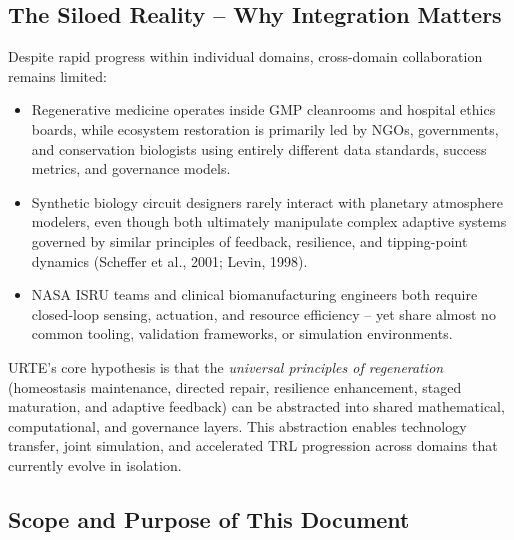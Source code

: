 \documentclass[11pt,a4paper]{article}
\begin{document}
\subsection{The Siloed Reality -- Why Integration Matters}

Despite rapid progress within individual domains, cross-domain collaboration remains limited:

\begin{itemize}
    \item Regenerative medicine operates inside GMP cleanrooms and hospital ethics boards, while ecosystem restoration is primarily led by NGOs, governments, and conservation biologists using entirely different data standards, success metrics, and governance models.
    \item Synthetic biology circuit designers rarely interact with planetary atmosphere modelers, even though both ultimately manipulate complex adaptive systems governed by similar principles of feedback, resilience, and tipping-point dynamics (Scheffer et al., 2001; Levin, 1998).
    \item NASA ISRU teams and clinical biomanufacturing engineers both require closed-loop sensing, actuation, and resource efficiency -- yet share almost no common tooling, validation frameworks, or simulation environments.
\end{itemize}

URTE's core hypothesis is that the \textit{universal principles of regeneration} (homeostasis maintenance, directed repair, resilience enhancement, staged maturation, and adaptive feedback) can be abstracted into shared mathematical, computational, and governance layers. This abstraction enables technology transfer, joint simulation, and accelerated TRL progression across domains that currently evolve in isolation.

\subsection{Scope and Purpose of This Document}
\end{document}

